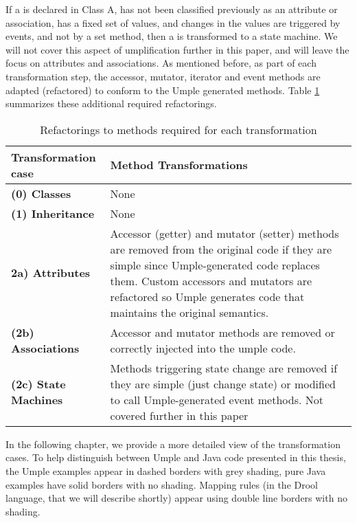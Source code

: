 \begin{description}
\begin{description}
If a is declared in Class A, has not been classified previously as an attribute or association, has a fixed set of values, and changes in the values are triggered by events, and not by a set method, then a is transformed to a state machine.	We will not cover this aspect of umplification further in this paper, and will leave the focus on attributes and associations.
As mentioned before, as part of each transformation step, the accessor, mutator, iterator and event methods are adapted (refactored) to conform to the Umple generated methods. Table \ref{table:trasnformations} summarizes these additional required refactorings. 
   \end{description}

\end{description}

\begin{table}[htbp]
	\caption{Refactorings to methods required for each transformation}
	\label{table:trasnformations}
    \centering
    \begin{tabularx}{\textwidth}{| X | X |}
        \hline
        \rowcolor[HTML]{BBDAFF}
       \textbf{ Transformation case  }   & \textbf{Method Transformations}
        \\ \hline
        \textbf{(0)  Classes }        & None      \\ \hline
        \textbf{(1)  Inheritance}     & None       \\ \hline
        \textbf{2a)  Attributes}      & 
        Accessor (getter) and mutator (setter) methods are removed from the original code 				if they are simple since Umple-generated code replaces them. Custom accessors and 				mutators are refactored so Umple generates code that maintains the original
        semantics.         		\\ \hline
        \textbf{(2b) Associations }   & 
 		Accessor and mutator methods are removed or correctly injected into the umple code.        
		\\ \hline
        \textbf{(2c) State Machines  }  & 
		Methods triggering state change are removed if they are simple (just change state) or 		modified to call Umple-generated event methods. Not covered further in this 					paper       		
\\ \hline
    \end{tabularx}
\end{table}

In the following chapter, we provide a more detailed view of the transformation cases. To help distinguish between Umple and Java code presented in this thesis, the Umple examples appear in dashed borders with grey shading, pure Java examples have solid borders with no shading. Mapping rules (in the Drool language, that we will describe shortly) appear using double line borders with no shading. 